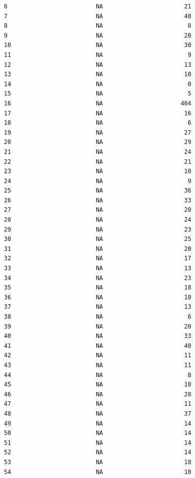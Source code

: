 \documentclass[
  letterpaper,
  DIV=11,
  numbers=noendperiod]{scrartcl}
\begin{document}
\begin{verbatim}
6                         NA                       21
7                         NA                       40
8                         NA                        8
9                         NA                       20
10                        NA                       30
11                        NA                        9
12                        NA                       13
13                        NA                       10
14                        NA                        0
15                        NA                        5
16                        NA                      404
17                        NA                       16
18                        NA                        6
19                        NA                       27
20                        NA                       29
21                        NA                       24
22                        NA                       21
23                        NA                       10
24                        NA                        9
25                        NA                       36
26                        NA                       33
27                        NA                       20
28                        NA                       24
29                        NA                       23
30                        NA                       25
31                        NA                       20
32                        NA                       17
33                        NA                       13
34                        NA                       23
35                        NA                       18
36                        NA                       10
37                        NA                       13
38                        NA                        6
39                        NA                       20
40                        NA                       33
41                        NA                       40
42                        NA                       11
43                        NA                       11
44                        NA                        8
45                        NA                       10
46                        NA                       28
47                        NA                       11
48                        NA                       37
49                        NA                       14
50                        NA                       14
51                        NA                       14
52                        NA                       14
53                        NA                       18
54                        NA                       10

\end{verbatim}
\end{document}
